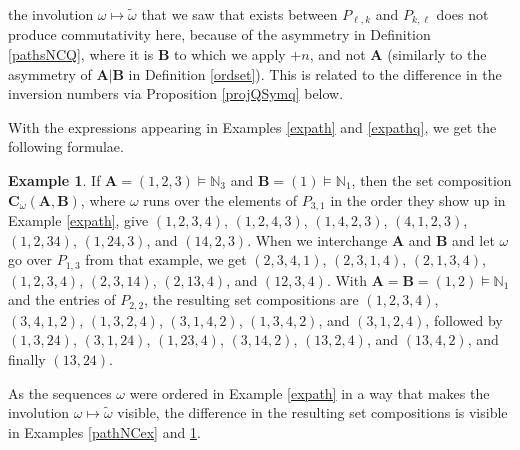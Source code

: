 \documentclass{article}
\theoremstyle{definition}
\newtheorem{ex}[thm]{Example}
\begin{document}
the involution $\omega\mapsto\tilde{\omega}$ that we saw that exists between $P_{\ell,k}$ and $P_{k,\ell}$ does not produce commutativity here, because of the asymmetry in Definition \ref{pathsNCQ}, where it is $\mathbf{B}$ to which we apply $+n$, and not $\mathbf{A}$ (similarly to the asymmetry of $\mathbf{A}|\mathbf{B}$ in Definition \ref{ordset}). This is related to the difference in the inversion numbers via Proposition \ref{projQSymq} below.

With the expressions appearing in Examples \ref{expath} and \ref{expathq}, we get the following formulae.
\begin{ex}
If $\mathbf{A}=(1,2,3)\vDash\mathbb{N}_{3}$ and $\mathbf{B}=(1)\vDash\mathbb{N}_{1}$, then the set composition $\mathbf{C}_{\omega}(\mathbf{A},\mathbf{B})$, where $\omega$ runs over the elements of $P_{3,1}$ in the order they show up in Example \ref{expath}, give $(1,2,3,4)$, $(1,2,4,3)$, $(1,4,2,3)$, $(4,1,2,3)$, $(1,2,34)$, $(1,24,3)$, and $(14,2,3)$. When we interchange $\mathbf{A}$ and $\mathbf{B}$ and let $\omega$ go over $P_{1,3}$ from that example, we get $(2,3,4,1)$, $(2,3,1,4)$, $(2,1,3,4)$, $(1,2,3,4)$, $(2,3,14)$, $(2,13,4)$, and $(12,3,4)$. With $\mathbf{A}=\mathbf{B}=(1,2)\vDash\mathbb{N}_{1}$ and the entries of $P_{2,2}$, the resulting set compositions are $(1,2,3,4)$, $(3,4,1,2)$, $(1,3,2,4)$, $(3,1,4,2)$, $(1,3,4,2)$, and $(3,1,2,4)$, followed by $(1,3,24)$, $(3,1,24)$, $(1,23,4)$, $(3,14,2)$, $(13,2,4)$, and $(13,4,2)$, and finally $(13,24)$. \label{expathNC}
\end{ex}
As the sequences $\omega$ were ordered in Example \ref{expath} in a way that makes the involution $\omega\mapsto\tilde{\omega}$ visible, the difference in the resulting set compositions is visible in Examples \ref{pathNCex} and \ref{expathNC}.

\medskip
\end{document}
